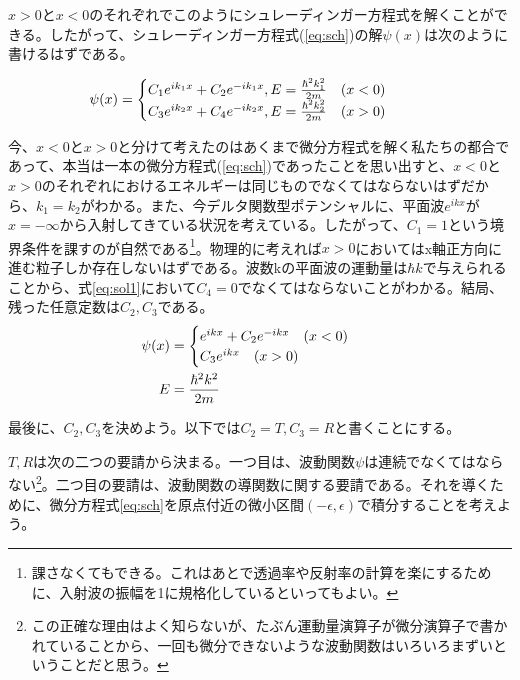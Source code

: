 \documentclass[uplatex,dvipdfmx]{jsarticle}
\begin{document}
$x>0$と$x<0$のそれぞれでこのようにシュレーディンガー方程式を解くことができる。したがって、シュレーディンガー方程式(\ref{eq:sch})の解$\psi(x)$は次のように書けるはずである。

\begin{align}
    \psi(x) &= \begin{cases}
        C_1 e^{ik_1x} + C_2 e^{-ik_1x}, E=\frac{\hbar^2k_1^2}{2m}  \qq{$(x<0)$} \\
        C_3 e^{ik_2x} + C_4 e^{-ik_2x}, E=\frac{\hbar^2k_2^2}{2m}  \qq{$(x>0)$} \label{eq:sol1}
    \end{cases}    
\end{align}

今、$x<0$と$x>0$と分けて考えたのはあくまで微分方程式を解く私たちの都合であって、本当は一本の微分方程式(\ref{eq:sch})であったことを思い出すと、$x<0$と$x>0$のそれぞれにおけるエネルギーは同じものでなくてはならないはずだから、$k_1 = k_2$がわかる。また、今デルタ関数型ポテンシャルに、平面波$e^{ikx}$が$x=-\infty$から入射してきている状況を考えている。したがって、$C_1=1$という境界条件を課すのが自然である\footnote{課さなくてもできる。これはあとで透過率や反射率の計算を楽にするために、入射波の振幅を1に規格化しているといってもよい。}。物理的に考えれば$x>0$においてはx軸正方向に進む粒子しか存在しないはずである。波数kの平面波の運動量は$\hbar k$で与えられることから、式\ref{eq:sol1}において$C_4=0$でなくてはならないことがわかる。結局、残った任意定数は$C_2, C_3$である。
\begin{align}
    \psi(x) &= \begin{cases}
        e^{ikx} + C_2 e^{-ikx} \qq{$(x<0)$} \\
        C_3 e^{ikx} \qq{$(x>0)$} \label{eq:sol2}
    \end{cases} \\
    E &= \frac{\hbar^2k^2}{2m}
\end{align}


\vspace{0.5cm}

最後に、$C_2, C_3$を決めよう。以下では$C_2 = T, C_3 = R$と書くことにする。

$T, R$は次の二つの要請から決まる。一つ目は、波動関数$\psi$は連続でなくてはならない\footnote{この正確な理由はよく知らないが、たぶん運動量演算子が微分演算子で書かれていることから、一回も微分できないような波動関数はいろいろまずいということだと思う。}。二つ目の要請は、波動関数の導関数に関する要請である。それを導くために、微分方程式\ref{eq:sch}を原点付近の微小区間$(-\epsilon, \epsilon)$で積分することを考えよう。
\end{document}
